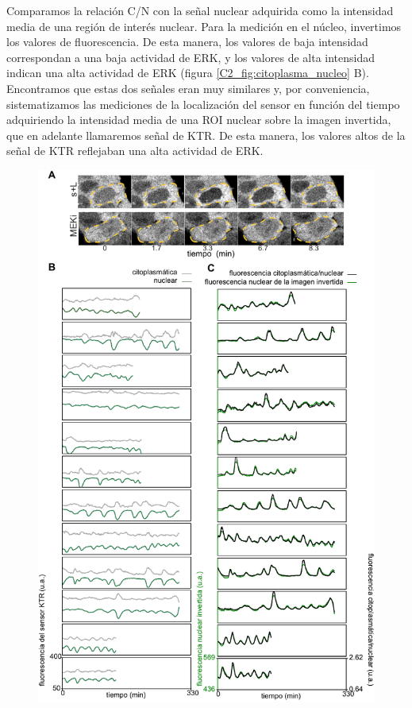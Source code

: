 \documentclass[./main.tex]{subfiles}
\begin{document}
Comparamos la relación C/N con la señal nuclear adquirida como la intensidad media de una región de interés nuclear. Para la medición en el núcleo, invertimos los valores de fluorescencia. De esta manera, los valores de baja intensidad correspondan a una baja actividad de ERK, y los valores de alta intensidad indican una alta actividad de ERK (figura \ref{C2_fig:citoplasma_nucleo} B). Encontramos que estas dos señales eran muy similares y, por conveniencia, sistematizamos las mediciones de la localización del sensor en función del tiempo adquiriendo la intensidad media de una ROI nuclear sobre la imagen invertida, que en adelante llamaremos señal de KTR. De esta manera, los valores altos de la señal de KTR reflejaban una alta actividad de ERK.


\begin{figure}
    \centering
    \includegraphics[width=1\columnwidth,scale =0.95]{figures/chapter2/C2_citoplasma_nucleo.pdf} 

\end{figure}
\end{document}
